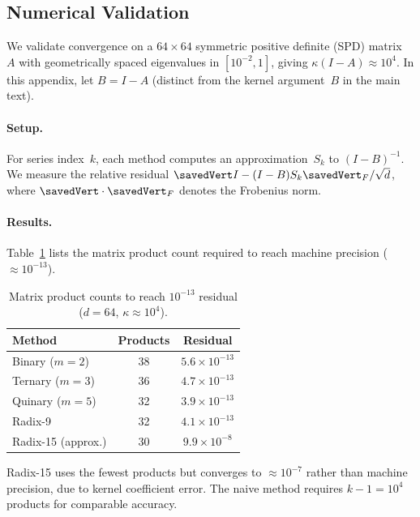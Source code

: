 \documentclass[
  journal=largetwo,
  manuscript=article,
  manuscriptlabel={Research Preprint},
  logo=false,
  simfonts=false,
  year=2026,
  volume=1,
]{cup-journal}
\let\|\savedVert
\theoremstyle{definition}
\theoremstyle{remark}
\begin{document}
\subsection{Numerical Validation}
\label{app:validation}

We validate convergence on a $64 \times 64$ symmetric positive definite (SPD) matrix~$A$ with
geometrically spaced eigenvalues in $[10^{-2}, 1]$, giving
$\kappa(I-A) \approx 10^4$. In this appendix, let $B = I - A$
(distinct from the kernel argument~$B$ in the main text).

\paragraph{Setup.}
For series index~$k$, each method computes an approximation~$S_k$ to
$(I-B)^{-1}$. We measure the relative residual
$\|I - (I-B)S_k\|_F / \sqrt{d}$, where $\|\cdot\|_F$ denotes the Frobenius norm.

\paragraph{Results.}
Table~\ref{tab:mmcounts} lists the matrix product count
required to reach machine precision ($\approx 10^{-13}$).

\begin{table}[ht]
\centering
\caption{Matrix product counts to reach $10^{-13}$ residual ($d=64$, $\kappa \approx 10^4$).}
\label{tab:mmcounts}
\begin{tabular}{@{}lcc@{}}
\toprule
Method & Products & Residual \\
\midrule
Binary ($m=2$)   & 38 & $5.6 \times 10^{-13}$ \\
Ternary ($m=3$)  & 36 & $4.7 \times 10^{-13}$ \\
Quinary ($m=5$)  & 32 & $3.9 \times 10^{-13}$ \\
Radix-9          & 32 & $4.1 \times 10^{-13}$ \\
Radix-15 (approx.)& 30 & $9.9 \times 10^{-8}$ \\
\bottomrule
\end{tabular}
\end{table}

Radix-15 uses the fewest products but converges to $\approx 10^{-7}$
rather than machine precision, due to kernel coefficient error.
The naive method requires $k-1 = 10^4$ products for comparable accuracy.
\end{document}
